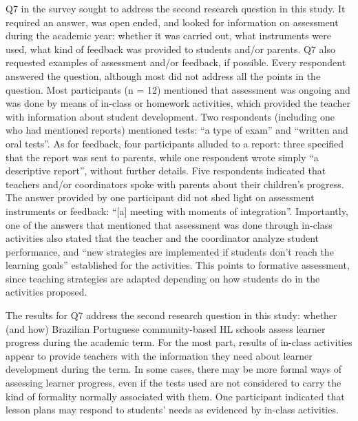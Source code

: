 \documentclass[output=paper]{langscibook}
\begin{document}
Q7 in the survey sought to address the second research question in this study. It required an answer, was open ended, and looked for information on assessment during the academic year: whether it was carried out, what instruments were used, what kind of feedback was provided to students and/or parents. Q7 also requested examples of assessment and/or feedback, if possible. Every respondent answered the question, although most did not address all the points in the question. Most participants (n = 12) mentioned that assessment was ongoing and was done by means of in-class or homework activities, which provided the teacher with information about student development. Two respondents (including one who had mentioned reports) mentioned tests: “a type of exam” and “written and oral tests”. As for feedback, four participants alluded to a report: three specified that the report was sent to parents, while one respondent wrote simply “a descriptive report”, without further details. Five respondents indicated that teachers and/or coordinators spoke with parents about their children’s progress. The answer provided by one participant did not shed light on assessment instruments or feedback: “[a] meeting with moments of integration”.  Importantly, one of the answers that mentioned that assessment was done through in-class activities also stated that the teacher and the coordinator analyze student performance, and “new strategies are implemented if students don’t reach the learning goals” established for the activities. This points to formative assessment, since teaching strategies are adapted depending on how students do in the activities proposed.

\begin{sloppypar}
  The results for Q7 address the second research question in this study: whether (and how) Brazilian Portuguese community-based HL schools assess learner progress during the academic term. For the most part, results of in-class activities appear to provide teachers with the information they need about learner development during the term. In some cases, there may be more formal ways of assessing learner progress, even if the tests used are not considered to carry the kind of formality normally associated with them. One participant indicated that lesson plans may respond to students’ needs as evidenced by in-class activities.
\end{sloppypar}
\end{document}
